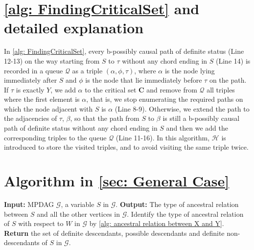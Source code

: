\documentclass{article}
\begin{document}
\section{\cref{alg: FindingCriticalSet} and detailed explanation} \label{Appendix: Detailed Explaination of algo}

In \cref{alg: FindingCriticalSet}, every b-possibly causal path of definite status (Line 12-13) on the way starting from $S$ to $\tau$ without any chord ending in $S$ (Line 14) is recorded in a queue $\mathcal{Q}$ as a triple $(\alpha,\phi,\tau)$, where $\alpha$ is the node lying immediately after $S$ and $\phi$ is the node that lie immediately before $\tau$ on the path. If $\tau$ is exactly $Y$, we add $\alpha$ to the critical set $\mathbf{C}$ and remove from $\mathcal{Q}$ all triples where the first element is $\alpha$, that is, we stop enumerating the required paths on which the node adjacent with $S$ is $\alpha$ (Line 8-9). Otherwise, we extend the path to the adjacencies of $\tau$, $\beta$, so that the path from $S$ to $\beta$ is still a b-possibly causal path of definite status without any chord ending in $S$ and then we add the corresponding triples to the queue $\mathcal{Q}$ (Line 11-16). In this algorithm, $\mathcal{H}$ is introduced to store the visited triples, and to avoid visiting the same triple twice.


\section{Algorithm in \cref{sec: General Case}} \label{Appendix: Additional Algorithms}

\begin{algorithm}
\begin{algorithmic}[1]
\caption{Identify the type of ancestral relation of $S$ with respect to all the other vertices in an MPDAG}
\label{alg: ancestral relation between X and all the other nodes}
\State \textbf{Input:} MPDAG $\mathcal{G}$, a variable $S$ in $\mathcal{G}$.
\State \textbf{Output:} The type of ancestral relation between $S$ and all the other vertices in $\mathcal{G}$.
    \State Identify the type of ancestral relation of $S$ with respect to $W$ in $\mathcal{G}$ by \cref{alg: ancestral relation between X and Y}.
\EndFor
\State \textbf{Return} the set of definite descendants, possible descendants and definite non-descendants of $S$ in $\mathcal{G}$.
\end{algorithmic}
\end{algorithm}
\end{document}
